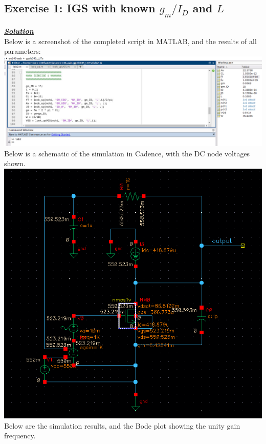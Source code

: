 \documentclass[12pt, fleqn]{article}
\begin{document}
\subsection{Exercise 1: IGS with known $g_m / I_D$ and $L$}
\underline{\textbf{\textit{Solution}}}\\[0.25cm]
Below is a screenshot of the completed script in MATLAB, and the results of all parameters:\\[0.25cm]
\includegraphics[scale=0.375, center]{mat_res1.PNG}\\[0.25cm]
Below is a schematic of the simulation in Cadence, with the DC node voltages shown.\\[0.25cm]
\includegraphics[scale=0.475, center]{schem1.PNG}\\[0.25cm]
\newpage
Below are the simulation results, and the Bode plot showing the unity gain frequency.\\[0.25cm]
\end{document}
